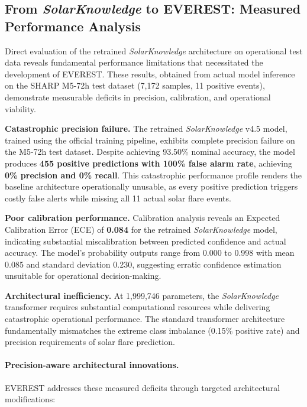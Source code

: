 \subsection{From \textit{SolarKnowledge} to \textsc{EVEREST}: Measured Performance Analysis}
\label{sec:sk2ev-measured}

Direct evaluation of the retrained \textit{SolarKnowledge} architecture on operational test data reveals fundamental performance limitations that necessitated the development of \textsc{EVEREST}. These results, obtained from actual model inference on the SHARP M5-72h test dataset (7,172 samples, 11 positive events), demonstrate measurable deficits in precision, calibration, and operational viability.

\textbf{Catastrophic precision failure.}
The retrained \textit{SolarKnowledge} v4.5 model, trained using the official training pipeline, exhibits complete precision failure on the M5-72h test dataset. Despite achieving 93.50\% nominal accuracy, the model produces \textbf{455 positive predictions with 100\% false alarm rate}, achieving \textbf{0\% precision and 0\% recall}. This catastrophic performance profile renders the baseline architecture operationally unusable, as every positive prediction triggers costly false alerts while missing all 11 actual solar flare events.

\textbf{Poor calibration performance.}
Calibration analysis reveals an Expected Calibration Error (ECE) of \textbf{0.084} for the retrained \textit{SolarKnowledge} model, indicating substantial miscalibration between predicted confidence and actual accuracy. The model's probability outputs range from 0.000 to 0.998 with mean 0.085 and standard deviation 0.230, suggesting erratic confidence estimation unsuitable for operational decision-making.

\textbf{Architectural inefficiency.}
At 1,999,746 parameters, the \textit{SolarKnowledge} transformer requires substantial computational resources while delivering catastrophic operational performance. The standard transformer architecture fundamentally mismatches the extreme class imbalance (0.15\% positive rate) and precision requirements of solar flare prediction.

\paragraph{Precision-aware architectural innovations.}
\textsc{EVEREST} addresses these measured deficits through targeted architectural modifications:

